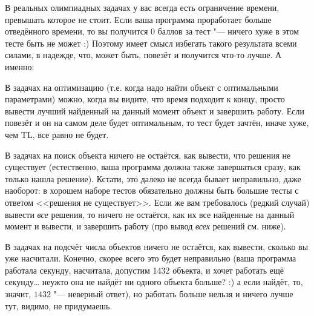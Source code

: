 

В реальных олимпиадных задачах у вас всегда есть ограничение времени, превышать которое не 
стоит. Если ваша программа проработает больше отведённого времени, то вы получится $0$ баллов за 
тест "--- ничего хуже в этом тесте быть не может :) Поэтому имеет смысл избегать такого 
результата всеми силами, в надежде, что, может быть, повезёт и получится что-то лучше. А именно:

\begin{ulist}
\item В задачах на оптимизацию (т.е. когда надо найти объект с оптимальными параметрами) можно, 
  когда вы видите, что время подходит к концу, просто вывести лучший найденный на данный 
  момент объект и завершить работу. Если повезёт и он на самом деле будет 
  оптимальным, то тест будет зачтён, иначе хуже, чем TL, все равно не будет.
\item В задачах на поиск объекта ничего не остаётся, как вывести, что решения не 
  существует (естественно, ваша программа должна также завершаться сразу, как только нашла решение). Кстати, это далеко не всегда бывает неправильно, даже наоборот: в хорошем наборе тестов обязательно должны быть большие тесты с ответом <<решения не существует>>.
  Если же вам требовалось (редкий случай) вывести \textit{все} решения, то ничего не 
  остаётся, как их все найденные на данный момент и вывести, и завершить работу (про вывод 
  \textit{всех} решений см. ниже).
\item В задачах на подсчёт числа объектов ничего не остаётся, как вывести, сколько 
  вы уже насчитали. Конечно, скорее всего это будет неправильно (ваша программа 
  работала секунду, насчитала, допустим 1432 объекта, и хочет работать ещё 
  секунду\dots{} неужто она не найдёт ни одного объекта больше? :) а если найдёт, 
  то, значит, $1432$ "--- неверный ответ), но работать больше нельзя и ничего 
  лучше тут, видимо, не придумаешь.
\end{ulist}
  
  

